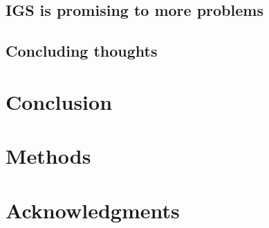\subsection{IGS is promising to more problems}

\subsection{Concluding thoughts}



\section{Conclusion}

\section{Methods}

\section{Acknowledgments}




